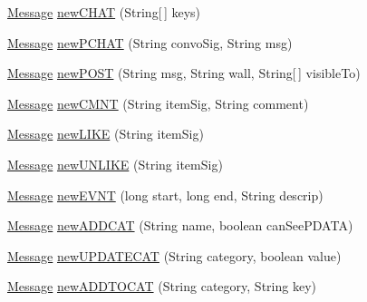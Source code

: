 \begin{DoxyCompactItemize}
\hyperlink{classballmerpeak_1_1turtlenet_1_1shared_1_1Message}{Message} \hyperlink{classballmerpeak_1_1turtlenet_1_1server_1_1MessageFactory_a0af47a494cce68d272366b9c5bf486bb}{new\-C\-H\-A\-T} (String\mbox{[}$\,$\mbox{]} keys)
\item 
\hyperlink{classballmerpeak_1_1turtlenet_1_1shared_1_1Message}{Message} \hyperlink{classballmerpeak_1_1turtlenet_1_1server_1_1MessageFactory_a8b3f97caecf16fb1438477a781cfefc1}{new\-P\-C\-H\-A\-T} (String convo\-Sig, String msg)
\item 
\hyperlink{classballmerpeak_1_1turtlenet_1_1shared_1_1Message}{Message} \hyperlink{classballmerpeak_1_1turtlenet_1_1server_1_1MessageFactory_a5e92918871b2aa9a8263e70c0d73e51c}{new\-P\-O\-S\-T} (String msg, String wall, String\mbox{[}$\,$\mbox{]} visible\-To)
\item 
\hyperlink{classballmerpeak_1_1turtlenet_1_1shared_1_1Message}{Message} \hyperlink{classballmerpeak_1_1turtlenet_1_1server_1_1MessageFactory_a82da74dad414bf54a6477d26e33ef2e0}{new\-C\-M\-N\-T} (String item\-Sig, String comment)
\item 
\hyperlink{classballmerpeak_1_1turtlenet_1_1shared_1_1Message}{Message} \hyperlink{classballmerpeak_1_1turtlenet_1_1server_1_1MessageFactory_a38bba7934fa384ff258714a9506029f8}{new\-L\-I\-K\-E} (String item\-Sig)
\item 
\hyperlink{classballmerpeak_1_1turtlenet_1_1shared_1_1Message}{Message} \hyperlink{classballmerpeak_1_1turtlenet_1_1server_1_1MessageFactory_ab70cf1c0f0ec11df5d5a55c444dee6c0}{new\-U\-N\-L\-I\-K\-E} (String item\-Sig)
\item 
\hyperlink{classballmerpeak_1_1turtlenet_1_1shared_1_1Message}{Message} \hyperlink{classballmerpeak_1_1turtlenet_1_1server_1_1MessageFactory_aec8e8561f1583c781f5bb11719def583}{new\-E\-V\-N\-T} (long start, long end, String descrip)
\item 
\hyperlink{classballmerpeak_1_1turtlenet_1_1shared_1_1Message}{Message} \hyperlink{classballmerpeak_1_1turtlenet_1_1server_1_1MessageFactory_ac31e65610f9ec3966639894fb47d7afc}{new\-A\-D\-D\-C\-A\-T} (String name, boolean can\-See\-P\-D\-A\-T\-A)
\item 
\hyperlink{classballmerpeak_1_1turtlenet_1_1shared_1_1Message}{Message} \hyperlink{classballmerpeak_1_1turtlenet_1_1server_1_1MessageFactory_ac9f69e89c9075dbc495aea39161fbdc4}{new\-U\-P\-D\-A\-T\-E\-C\-A\-T} (String category, boolean value)
\item 
\hyperlink{classballmerpeak_1_1turtlenet_1_1shared_1_1Message}{Message} \hyperlink{classballmerpeak_1_1turtlenet_1_1server_1_1MessageFactory_afd84179b0e98eec0fc3a04baec495de8}{new\-A\-D\-D\-T\-O\-C\-A\-T} (String category, String key)

\end{DoxyCompactItemize}
